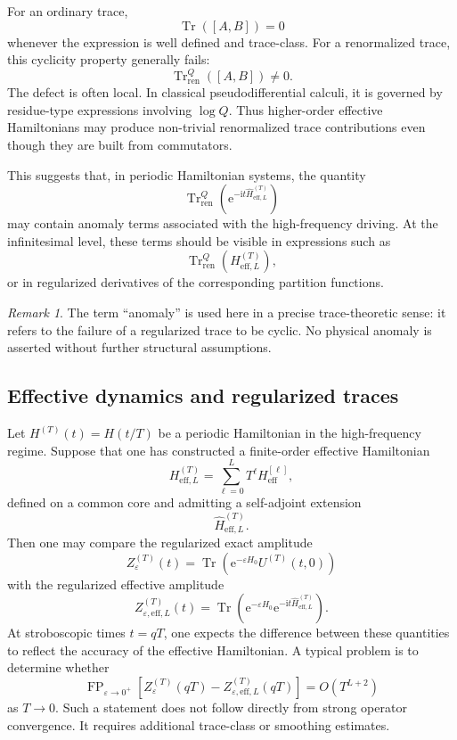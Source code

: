 \documentclass[11pt]{amsart}
\theoremstyle{plain}
\theoremstyle{definition}
\theoremstyle{remark}
\newtheorem{remark}[theorem]{Remark}
\newcommand{\Tr}{\operatorname{Tr}}
\newcommand{\FP}{\operatorname{FP}}
\newcommand{\ii}{\mathrm i}
\newcommand{\ee}{\mathrm e}
\begin{document}
For an ordinary trace,
\[
        \Tr([A,B])=0
\]
whenever the expression is well defined and trace-class.  For a
renormalized trace, this cyclicity property generally fails:
\[
        \Tr_{\mathrm{ren}}^Q([A,B])\neq0.
\]
The defect is often local.  In classical pseudodifferential calculi, it
is governed by residue-type expressions involving \(\log Q\).  Thus
higher-order effective Hamiltonians may produce non-trivial
renormalized trace contributions even though they are built from
commutators.

This suggests that, in periodic Hamiltonian systems, the quantity
\[
        \Tr_{\mathrm{ren}}^Q
        \left(
        \ee^{-\ii t\widehat H_{\mathrm{eff},L}^{(T)}}
        \right)
\]
may contain anomaly terms associated with the high-frequency driving.
At the infinitesimal level, these terms should be visible in expressions
such as
\[
        \Tr_{\mathrm{ren}}^Q
        \left(
        H_{\mathrm{eff},L}^{(T)}
        \right),
\]
or in regularized derivatives of the corresponding partition functions.

\begin{remark}
The term ``anomaly'' is used here in a precise trace-theoretic sense:
it refers to the failure of a regularized trace to be cyclic.  No
physical anomaly is asserted without further structural assumptions.
\end{remark}

\subsection{Effective dynamics and regularized traces}

Let \(H^{(T)}(t)=H(t/T)\) be a periodic Hamiltonian in the high-frequency
regime.  Suppose that one has constructed a finite-order effective
Hamiltonian
\[
        H_{\mathrm{eff},L}^{(T)}
        =
        \sum_{\ell=0}^{L}
        T^\ell H_{\mathrm{eff}}^{[\ell]},
\]
defined on a common core and admitting a self-adjoint extension
\[
        \widehat H_{\mathrm{eff},L}^{(T)}.
\]
Then one may compare the regularized exact amplitude
\[
        Z_\varepsilon^{(T)}(t)
        =
        \Tr\left(
        \ee^{-\varepsilon H_0}
        U^{(T)}(t,0)
        \right)
\]
with the regularized effective amplitude
\[
        Z_{\varepsilon,\mathrm{eff},L}^{(T)}(t)
        =
        \Tr\left(
        \ee^{-\varepsilon H_0}
        \ee^{-\ii t\widehat H_{\mathrm{eff},L}^{(T)}}
        \right).
\]
At stroboscopic times \(t=qT\), one expects the difference between these
quantities to reflect the accuracy of the effective Hamiltonian.  A
typical problem is to determine whether
\[
        \FP_{\varepsilon\to0^+}
        \left[
        Z_\varepsilon^{(T)}(qT)
        -
        Z_{\varepsilon,\mathrm{eff},L}^{(T)}(qT)
        \right]
        =
        O(T^{L+2})
\]
as \(T\to0\).  Such a statement does not follow directly from strong
operator convergence.  It requires additional trace-class or smoothing
estimates.
\end{document}
